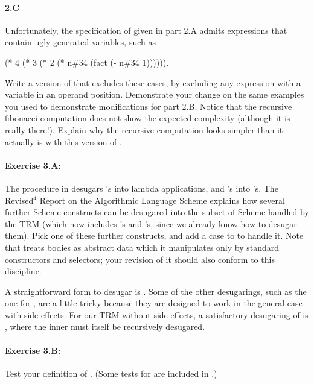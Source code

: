 \paragraph{2.C} Unfortunately, the specification of 
given in part 2.A admits expressions that contain ugly generated
variables, such as

\beginlispbig
(* 4 (* 3 (* 2 (* n\#34 (fact (- n\#34 1)))))).
\endlisp

Write a version of  that excludes these cases, by
excluding any expression with a variable in an operand position.
Demonstrate your change on the same examples you used to demonstrate
modifications for part 2.B.  Notice that the recursive fibonacci
computation does not show the expected complexity (although it is
really there!).  Explain why the recursive computation looks simpler
than it actually is with this version of .

\paragraph{Exercise 3.A:} The  procedure in
 desugars 's into lambda applications,
and 's into 's.  The Revised$^4$ Report on the
Algorithmic Language Scheme explains how
several further Scheme constructs can be desugared into the subset of
Scheme handled by the TRM (which now includes 's and
's, since we already know how to desugar them).  Pick one
of these further constructs, and add a case to  to
handle it.  Note that  treats bodies as abstract data
which it manipulates only by standard constructors and selectors; your
revision of it should also conform to this discipline.

A straightforward form to desugar is .  Some of the other
desugarings, such as the one for , are a little tricky
because they are designed to work in the general case with
side-effects.  For our TRM without side-effects, a satisfactory
desugaring of  is , where the inner  must itself be
recursively desugared.

\paragraph{Exercise 3.B:} Test your definition of .
(Some tests for  are included in .)

















